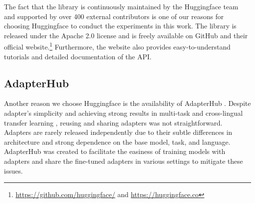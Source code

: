 The fact that the library is continuously maintained by the Huggingface team and supported by over 400 external contributors is one of our reasons for choosing Huggingface to conduct the experiments in this work. The library is released under the Apache 2.0 license and is freely available on GitHub and their official website.\footnote{\url{https://github.com/huggingface/} and \url{https://huggingface.co}} Furthermore, the website also provides easy-to-understand tutorials and detailed documentation of the API.

\subsection{AdapterHub}
Another reason we choose Huggingface is the availability of AdapterHub . Despite adapter's simplicity and achieving strong results in multi-task and cross-lingual transfer learning , reusing and sharing adapters was not straightforward. Adapters are rarely released independently due to their subtle differences in architecture and strong dependence on the base model, task, and language. AdapterHub was created to facilitate the easiness of training models with adapters and share the fine-tuned adapters in various settings to mitigate these issues.




